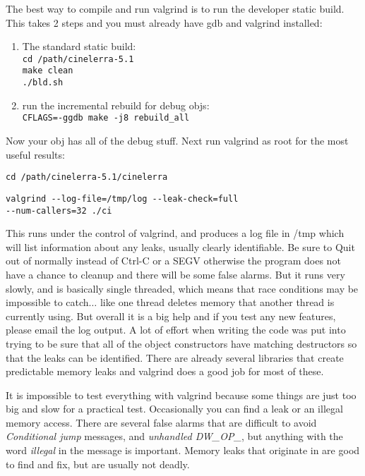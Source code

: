 The best way to compile and run valgrind is to run the developer static build. This takes 2 steps and you must already have gdb and valgrind installed:

\begin{enumerate}[nosep]
	\item The standard static build:\\
		\texttt{cd /path/cinelerra-5.1}\\
		\texttt{make clean}\\
		\texttt{./bld.sh}
	\item run the incremental rebuild for debug objs:\\
		\texttt{CFLAGS=-ggdb make -j8 rebuild\_all}
\end{enumerate}

Now your \CGG{} obj has all of the debug stuff. Next run valgrind as root for the most useful results:

\hspace{2em}\texttt{cd /path/cinelerra-5.1/cinelerra}

\hspace{2em}\texttt{valgrind -{}-log-file=/tmp/log -{}-leak-check=full\\
	-{}-num-callers=32 ./ci}

This runs \CGG{} under the control of valgrind, and produces a log file in /tmp which will list information about any leaks, usually clearly identifiable. Be sure to Quit out of \CGG{} normally instead of Ctrl-C or a SEGV otherwise the program does not have a chance to cleanup and there will be some false alarms. But it runs very slowly, and is basically single threaded, which means that race conditions may be impossible to catch$\dots$ like one thread deletes memory that another thread is currently using. But overall it is a big help and if you test any new features, please email the log output. A lot of effort when writing the code was put into trying to be sure that all of the object constructors have matching destructors so that the leaks can be identified. There are already several libraries that create predictable memory leaks and valgrind does a good job for most of these.

It is impossible to test everything with valgrind because some things are just too big and slow for a practical test. Occasionally you can find a leak or an illegal memory access. There are several false alarms that are difficult to avoid \textit{Conditional jump} messages, and \textit{unhandled DW\_OP\_}, but anything with the word \textit{illegal} in the message is important. Memory leaks that originate in \CGG{} are good to find and fix, but are usually not deadly.

